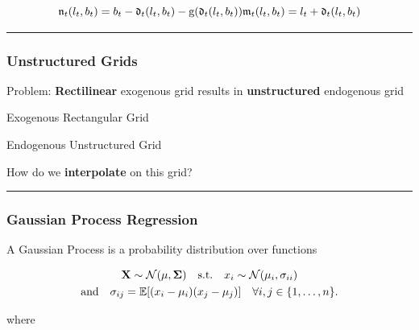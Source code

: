 \documentclass[
  letterpaper,
  DIV=11,
  numbers=noendperiod]{scrartcl}
\begin{document}
\[\begin{equation}
  \mathfrak{n}_{t}(l_{t}, b_{t}) = b_{t} -
  \mathfrak{d}_{t}(l_{t}, b_{t}) - \mathrm{g}(\mathfrak{d}_{t}(l_{t},
    b_{t})) \\
  \mathfrak{m}_{t}(l_{t}, b_{t}) = l_{t} +
  \mathfrak{d}_{t}(l_{t}, b_{t})
\end{equation}\]

\begin{center}\rule{0.5\linewidth}{0.5pt}\end{center}

\hypertarget{unstructured-grids}{%
\subsubsection{Unstructured Grids}\label{unstructured-grids}}

Problem: \textbf{Rectilinear} exogenous grid results in
\textbf{unstructured} endogenous grid

Exogenous Rectangular Grid

Endogenous Unstructured Grid

How do we \textbf{interpolate} on this grid?

\begin{center}\rule{0.5\linewidth}{0.5pt}\end{center}

\hypertarget{gaussian-process-regression}{%
\subsubsection{Gaussian Process
Regression}\label{gaussian-process-regression}}

A Gaussian Process is a probability distribution over functions

\[\begin{equation}
\begin{gathered}
    \mathbf{X} \sim \mathcal{N}(\mathbf{\mu}, \mathbf{\Sigma}) \quad \text{s.t.} \quad x_i \sim \mathcal{N}(\mu_i, \sigma_{ii}) \\
    \text{and} \quad  \sigma_{ij} = \mathbb{E}[(x_i - \mu_i)(x_j - \mu_j)] \quad \forall i,j \in \{1, \ldots, n\}.
  \end{gathered}
\end{equation}\]

where
\end{document}
